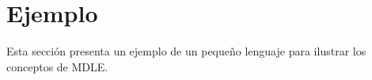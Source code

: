 

\section{Ejemplo}
\label{sec:ejemplo}

Esta sección presenta un ejemplo de un pequeño lenguaje para ilustrar los conceptos de MDLE. 